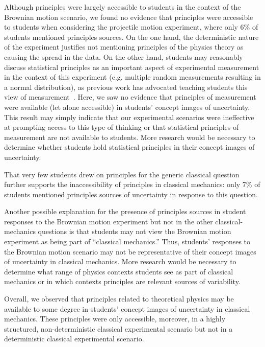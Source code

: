 \documentclass[english,aps,prstper,reprint,showpacs,longbibliography,superscriptaddress,nofootinbib]{revtex4-2}
\begin{document}
Although principles were largely accessible to students in the context of the Brownian motion scenario, we found no evidence that principles were accessible to students when considering the projectile motion experiment, where only 6\% of students mentioned principles sources. On the one hand, the deterministic nature of the experiment justifies not mentioning principles of the physics theory as causing the spread in the data. On the other hand, students may reasonably discuss statistical principles as an important aspect of experimental measurement in the context of this experiment (e.g. multiple random measurements resulting in a normal distribution), as previous work has advocated teaching students this view of measurement~\cite{Evangelinos1999,Evangelinos2002,Allie2003,Pillay2008,Buffler2008}. Here, we saw no evidence that principles of measurement were available (let alone accessible) in students' concept images of uncertainty. This result may simply indicate that our experimental scenarios were ineffective at prompting access to this type of thinking or that statistical principles of measurement are not available to students. More research would be necessary to determine whether students hold statistical principles in their concept images of uncertainty.

That very few students drew on principles for the generic classical question further supports the inaccessibility of principles in classical mechanics: only 7\% of students mentioned principles sources of uncertainty in response to this question.

Another possible explanation for the presence of principles sources in student responses to the Brownian motion experiment but not in the other classical-mechanics questions is that students may not view the Brownian motion experiment as being part of ``classical mechanics.'' Thus, students' responses to the Brownian motion scenario may not be representative of their concept images of uncertainty in classical mechanics. More research would be necessary to determine what range of physics contexts students see as part of classical mechanics or in which contexts principles are relevant sources of variability.

Overall, we observed that principles related to theoretical physics may be available to some degree in students' concept images of uncertainty in classical mechanics. These principles were only accessible, moreover, in a highly structured, non-deterministic classical experimental scenario but not in a deterministic classical experimental scenario.
\end{document}
